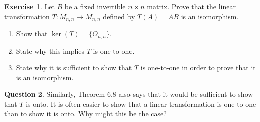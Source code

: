 \documentclass{beamer}
\newcommand{\fn}{\insertframenumber}
\theoremstyle{definition}
\newtheorem{exercise}{Exercise}
\newtheorem{question}[exercise]{Question}
\begin{document}
\begin{frame}{\fn}
	\begin{exercise}
		Let $B$ be a fixed invertible $n\times n$ matrix.  
		Prove that the linear transformation $T:M_{n,n}\to M_{n,n}$ defined by $T(A)=AB$ is an isomorphism.
			\begin{enumerate}[label=(\alph*)]
				\item Show that $\ker(T)=\{O_{n,n}\}$.
				\item State why this implies $T$ is one-to-one.
				\item State why it is sufficient to show that $T$ is one-to-one in order to prove that it is an isomorphism.
			\end{enumerate}
	\end{exercise}
	\begin{question}
		Similarly, Theorem 6.8 also says that it would be sufficient to show that $T$ is onto.
		It is often easier to show that a linear transformation is one-to-one than to show it is onto.  Why might this be the case?
	\end{question}
\end{frame}
\end{document}
